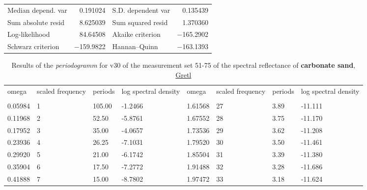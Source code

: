 \documentclass[10pt, a4paper]{article}
\begin{document}
\begin{appendices}
\begin{table}[H]
\begin{center}
\vspace{1ex}
	\begin{tabular}{lrlr}
		Median depend. var &  0.191024 & S.D. dependent var &  0.135439 \\
		Sum absolute resid &  8.625039 & Sum squared resid &  1.370360 \\
		Log-likelihood &  84.64508 & Akaike criterion & $-$165.2902 \\
		Schwarz criterion & $-$159.9822 & Hannan--Quinn & $-$163.1393 \\ \hline \hline
	\end{tabular}
	\end{center}
\label{tab:29}
\end{table}
\pagebreak

\begin{table}[H]
	\begin{small}
	\caption{Results of the \textit{periodogramm} for v30 of the measurement set 51-75 of the spectral reflectance of \textbf{carbonate sand}, \href{http://gretl.sourceforge.net/}{Gretl}}
	\label{tab:30}
	\begin{center}
	\begin{tabular}{|p{15mm} p{15mm} p{15mm} p{15mm} || p{15mm} p{15mm}p{15mm} p{15mm}|}
		omega & scaled frequency & periods & log spectral density & omega & scaled frequency & periods & log spectral density \\ \\ \hline\hline
		0.05984      & 1    &      105.00  &      -1.2466  &  1.61568   &   27    &        3.89     &    -11.111\\ 
		 0.11968     &  2   &        52.50   &      -5.8761 &   1.67552   &   28    &        3.75     &    -11.170\\ 
		 0.17952     &  3   &        35.00   &      -4.0657 &  1.73536   &   29    &        3.62     &    -11.208\\ 
		 0.23936     &  4   &        26.25   &      -7.1031 &  1.79520   &   30    &        3.50     &    -11.461\\ 
		 0.29920     &  5   &        21.00   &      -6.1742 &  1.85504   &   31    &        3.39     &    -11.380\\ 
		 0.35904     &  6   &        17.50   &      -7.2772  & 1.91488    & 32     &       3.28      &   -11.686\\ 
		 0.41888     &  7     &      15.00   &      -8.7802 &  1.97472    &  33    &        3.18     &    -11.624\\ 

\end{tabular}
\end{center}
\end{small}
\end{table}
\end{appendices}
\end{document}
